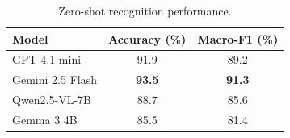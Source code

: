 \documentclass{article}
\begin{document}

\begin{table}[httb]
\centering
\caption{Zero-shot recognition performance.}
\label{tab:recognition_results}
\begin{tabular}{lcc}
\toprule
\textbf{Model} & \textbf{Accuracy (\%)} & \textbf{Macro-F1 (\%)} \\
\midrule
GPT-4.1 mini
& 91.9
& 89.2 \\

Gemini 2.5 Flash
& \textbf{93.5}
& \textbf{91.3} \\

Qwen2.5-VL-7B
& 88.7
& 85.6 \\

Gemma 3 4B
& 85.5
& 81.4 \\
\bottomrule
\end{tabular}
\end{table}
\end{document}
